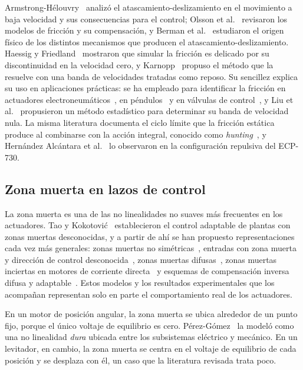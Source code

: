Armstrong-Hélouvry~\cite{armstrong} analizó el atascamiento-deslizamiento en el movimiento a baja velocidad y sus consecuencias para el control; Olsson et al.~\cite{olsson} revisaron los modelos de fricción y su compensación, y Berman et al.~\cite{berman} estudiaron el origen físico de los distintos mecanismos que producen el atascamiento-deslizamiento. Haessig y Friedland~\cite{haessig} mostraron que simular la fricción es delicado por su discontinuidad en la velocidad cero, y Karnopp~\cite{karnopp} propuso el método que la resuelve con una banda de velocidades tratadas como reposo. Su sencillez explica su uso en aplicaciones prácticas: se ha empleado para identificar la fricción en actuadores electroneumáticos~\cite{ravanbod,ravanbod1}, en péndulos~\cite{bicakci} y en válvulas de control~\cite{romano}, y Liu et al.~\cite{liu} propusieron un método estadístico para determinar su banda de velocidad nula. La misma literatura documenta el ciclo límite que la fricción estática produce al combinarse con la acción integral, conocido como \emph{hunting}~\cite{olsson,armstrong}, y Hernández Alcántara et al.~\cite{alcantara} lo observaron en la configuración repulsiva del ECP-730.

\subsection{Zona muerta en lazos de control}

La zona muerta es una de las no linealidades no suaves más frecuentes en los actuadores. Tao y Kokotović~\cite{gang} establecieron el control adaptable de plantas con zonas muertas desconocidas, y a partir de ahí se han propuesto representaciones cada vez más generales: zonas muertas no simétricas~\cite{salim}, entradas con zona muerta y dirección de control desconocida~\cite{huanqing}, zonas muertas difusas~\cite{zhi}, zonas muertas inciertas en motores de corriente directa~\cite{nizar} y esquemas de compensación inversa difusa y adaptable~\cite{guanyu}. Estos modelos y los resultados experimentales que los acompañan representan solo en parte el comportamiento real de los actuadores.

En un motor de posición angular, la zona muerta se ubica alrededor de un punto fijo, porque el único voltaje de equilibrio es cero. Pérez-Gómez~\cite{perez} la modeló como una no linealidad \emph{dura} ubicada entre los subsistemas eléctrico y mecánico. En un levitador, en cambio, la zona muerta se centra en el voltaje de equilibrio de cada posición y se desplaza con él, un caso que la literatura revisada trata poco.

